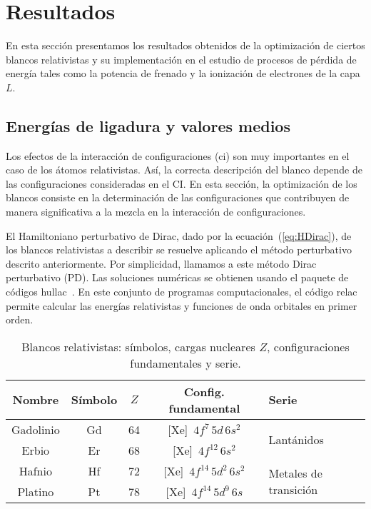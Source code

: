 \section{Resultados}
\label{sec:results-heavy}

En esta sección presentamos los resultados obtenidos de la optimización
de ciertos blancos relativistas y su implementación en el estudio de 
procesos de pérdida de energía tales como la potencia de frenado y la 
ionización de electrones de la capa $L$.

\subsection{Energías de ligadura y valores medios}
\label{subsec:results-target}

Los efectos de la interacción de configuraciones (\acs{ci}) son muy 
importantes en el caso de los átomos relativistas. Así, la correcta 
descripción del blanco depende de las configuraciones consideradas en 
el CI. En esta sección, la optimización de los blancos consiste en la 
determinación de las configuraciones que contribuyen de manera 
significativa a la mezcla en la interacción de configuraciones. 

El Hamiltoniano perturbativo de Dirac, dado por la 
ecuación~(\ref{eq:HDirac}), de los blancos relativistas a describir se 
resuelve aplicando el método perturbativo descrito anteriormente. Por 
simplicidad, llamamos a este método Dirac perturbativo (PD). Las 
soluciones numéricas se obtienen usando el paquete de códigos 
{\sc hullac}~\cite{BarShalom:01}. En este conjunto de programas 
computacionales, el código {\sc relac} permite calcular las energías 
relativistas y funciones de onda orbitales en primer orden. 

\begin{table*}[t]
\centering
\begin{tabular}{|c|c|c|c|l|}
\hline
Nombre   & Símbolo & $Z$ & Config. fundamental & Serie \\
\hline
\hline
Gadolinio & Gd & 64 & [Xe]~$4f^7\,5d\,6s^2$ & \multirow{2}{*}{Lantánidos} \\
Erbio     & Er & 68 & [Xe]~$4f^{12}\,6s^2$ & \\
\hline
Hafnio  & Hf & 72 & [Xe]~$4f^{14}\,5d^2\,6s^2$ & \multirow{2}{*}{Metales de transición}\\
Platino & Pt & 78 & [Xe]~$4f^{14}\,5d^9\,6s$ & \\
\hline
\end{tabular}
\caption[Blancos relativistas y sus configuraciones fundamentales]
{Blancos relativistas: símbolos, cargas nucleares $Z$, configuraciones 
fundamentales y serie.}
\label{tab:gruposrelat} 
\end{table*}

